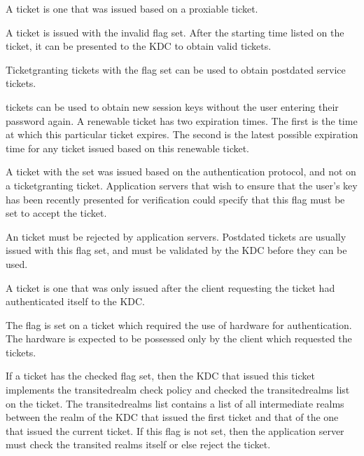 \documentclass[letterpaper,10pt,english]{sphinxmanual}
\begin{document}
\sphinxAtStartPar
A  ticket is one that was issued based on a proxiable ticket.

\sphinxAtStartPar
A  ticket is issued with the invalid flag set.  After the
starting time listed on the ticket, it can be presented to the KDC to
obtain valid tickets.

\sphinxAtStartPar
Ticket\sphinxhyphen{}granting tickets with the  flag set can be used
to obtain postdated service tickets.

\sphinxAtStartPar
{} tickets can be used to obtain new session keys without
the user entering their password again.  A renewable ticket has two
expiration times.  The first is the time at which this particular
ticket expires.  The second is the latest possible expiration time for
any ticket issued based on this renewable ticket.

\sphinxAtStartPar
A ticket with the  set was issued based on the
authentication protocol, and not on a ticket\sphinxhyphen{}granting ticket.
Application servers that wish to ensure that the user’s key has been
recently presented for verification could specify that this flag must
be set to accept the ticket.

\sphinxAtStartPar
An  ticket must be rejected by application servers.
Postdated tickets are usually issued with this flag set, and must be
validated by the KDC before they can be used.

\sphinxAtStartPar
A  ticket is one that was only issued after the
client requesting the ticket had authenticated itself to the KDC.

\sphinxAtStartPar
The  flag is set on a ticket which required
the use of hardware for authentication.  The hardware is expected to
be possessed only by the client which requested the tickets.

\sphinxAtStartPar
If a ticket has the  checked flag set, then the KDC
that issued this ticket implements the transited\sphinxhyphen{}realm check policy
and checked the transited\sphinxhyphen{}realms list on the ticket.  The
transited\sphinxhyphen{}realms list contains a list of all intermediate realms
between the realm of the KDC that issued the first ticket and that of
the one that issued the current ticket.  If this flag is not set, then
the application server must check the transited realms itself or else
reject the ticket.
\end{document}
